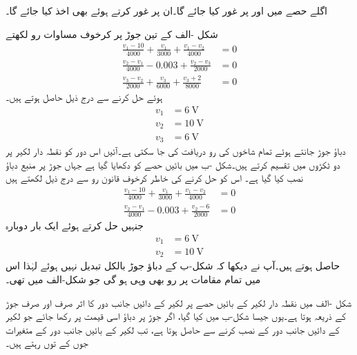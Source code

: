 اگلے حصے میں  اور  پر غور کیا جائے گا۔ان پر غور کرتے ہوئے  بھی اخذ کیا جائے گا۔

شکل -الف  کے تین جوڑ پر کرخوف مساوات رو لکھتے
\begin{align*}
\frac{v_1-10}{4000}+\frac{v_1}{3000}+\frac{v_1-v_2}{4000}&=0\\
\frac{v_2-v_1}{4000}-0.003+\frac{v_2-v_3}{2000}&=0\\
\frac{v_3-v_2}{2000}+\frac{v_3}{6000}+\frac{v_3+2}{8000}&=0
\end{align*}
ہوئے حل کرنے سے درج ذیل حاصل ہوتے ہیں۔
\begin{align*}
v_1&=\SI{6}{\volt}\\
v_2&=\SI{10}{\volt}\\
v_3&=\SI{6}{\volt}
\end{align*}
دباؤ جوڑ جانتے ہوئے تمام شاخوں کی رو دریافت کی جا سکتی ہے۔آئیں اس دور کو نقطہ دار لکیر پر دو ٹکڑوں میں تقسیم کرتے ہیں۔شکل -ب میں بائیں حصے کو دکھایا گیا ہے جہاں جوڑ  پر  منبع دباؤ نصب کیا گیا ہے۔ اس کو حل کرنے کی خاطر کرخوف قانون رو سے درج ذیل لکھتے ہیں
\begin{align*}
\frac{v_1-10}{4000}+\frac{v_1}{3000}+\frac{v_1-v_2}{4000}&=0\\
\frac{v_2-v_1}{4000}-0.003+\frac{v_2-6}{2000}&=0
\end{align*}
جنہیں حل کرتے ہوئے ایک بار دوبارہ
\begin{align*}
v_1&=\SI{6}{\volt}\\
v_2&=\SI{10}{\volt}
\end{align*}
حاصل ہوتے ہیں۔آپ نے دیکھا کہ شکل-ب کے  دباؤ جوڑ بالکل تبدیل نہیں ہوئے لہٰذا اس میں تمام مقامات پر رو بھی وہی ہو گی جو شکل-الف میں تھی۔

شکل -الف میں نقطہ دار لکیر کے بائیں حصے پر لکیر کے دائیں جانب دور کا اثر صرف اور صرف جوڑ  کے ذریعہ ہوتا ہے۔یوں جیسا شکل-ب میں کیا گیا، اگر جوڑ  پر دباؤ اسی قیمت پر رکھا جائے جو لکیر کے دائیں جانب دور کے نصب کرنے سے حاصل ہوتا ہے، تب  لکیر کے بائیں جانب دور کے متغیرات جوں کے توں رہتے ہیں۔  

